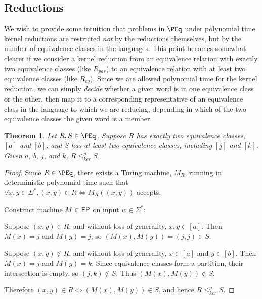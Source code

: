 \documentclass{amsart}
\newtheorem{theorem}{Theorem}[section]
\theoremstyle{definition} \newtheorem{definition}[definition]{Definition}
\newcommand{\sigmastar}{\Sigma^{*}} %
\newcommand{\kr}{\leq^{p}_{ker}} %
\begin{document}
\subsection{Reductions}

We wish to provide some intuition that problems in $\PEq$ under polynomial time
kernel reductions are restricted \emph{not} by the reductions themselves, but
by the number of equivalence classes in the languages. This point becomes
somewhat clearer if we consider a kernel reduction from an equivalence relation
with exactly two equivalence classes (like $R_{par}$) to an equivalence
relation with at least two equivalence classes (like $R_{eq}$). Since we are
allowed polynomial time for the kernel reduction, we can simply \emph{decide}
whether a given word is in one equivalence class or the other, then map it to a
corresponding representative of an equivalence class in the language to which
we are reducing, depending in which of the two equivalence classes the given
word is a member.

\begin{theorem}\label{thm:two_eq_classes}
  Let $R,S\in\PEq$. Suppose $R$ has exactly two equivalence classes, $[a]$ and
  $[b]$, and $S$ has at least two equivalence classes, including $[j]$ and
  $[k]$. Given $a$, $b$, $j$, and $k$, $R\kr S$.
\end{theorem}
\begin{proof}
  Since $R\in\PEq$, there exists a Turing machine, $M_R$, running in
  deterministic polynomial time such that $\forall x,y\in\sigmastar, (x,y)\in
  R\iff M_R((x,y))$ accepts.

  Construct machine $M\in{\ensuremath{\mathsf{FP}}}$ on input $w\in\sigmastar$:\\
  \begin{algorithm}[H]
  \end{algorithm}

  Suppose $(x,y)\in R$, and without loss of generality, $x,y\in[a]$. Then
  $M(x)=j$ and $M(y)=j$, so $(M(x),M(y))=(j,j)\in S$.

  Suppose $(x,y)\notin R$, and without loss of generality, $x\in[a]$ and
  $y\in[b]$. Then $M(x)=j$ and $M(y)=k$. Since equivalence classes form a
  partition, their intersection is empty, so $(j,k)\notin S$. Thus
  $(M(x),M(y))\notin S$.

  Therefore $(x,y)\in R\iff (M(x),M(y))\in S$, and hence $R\kr S$.
\end{proof}
\end{document}
